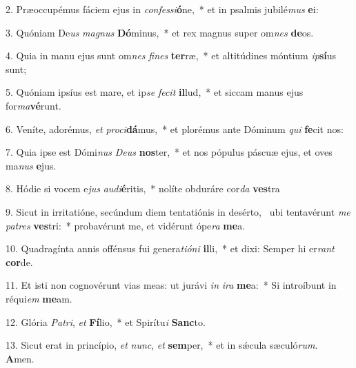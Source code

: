 2. Præoccupémus fáciem ejus in \textit{con}\textit{fes}\textit{si}\textbf{ó}ne,~*  et in psalmis jubilé\textit{mus} \textbf{e}i:\

3. Quóniam De\textit{us} \textit{ma}\textit{gnus} \textbf{Dó}minus,~*  et rex magnus super om\textit{nes} \textbf{de}os.\

4. Quia in manu ejus sunt om\textit{nes} \textit{fi}\textit{nes} \textbf{ter}ræ,~*  et altitúdines móntium \textit{ip}\textbf{sí}us sunt;\

5. Quóniam ipsíus est mare, et ip\textit{se} \textit{fe}\textit{cit} \textbf{il}lud,~*  et siccam manus ejus for\textit{ma}\textbf{vé}runt.\

6. Veníte, adorémus, \textit{et} \textit{pro}\textit{ci}\textbf{dá}mus,~*  et plorémus ante Dóminum \textit{qui} \textbf{fe}cit nos:\

7. Quia ipse est Dómi\textit{nus} \textit{De}\textit{us} \textbf{nos}ter,~*  et nos pópulus páscuæ ejus, et oves ma\textit{nus} \textbf{e}jus.\

8. Hódie si vocem e\textit{jus} \textit{au}\textit{di}\textbf{é}ritis,~*  nolíte obduráre cor\textit{da} \textbf{ves}tra\

9. Sicut in irritatióne, secúndum diem tentatiónis in desérto, \dag\  ubi tentavérunt \textit{me} \textit{pa}\textit{tres} \textbf{ves}tri:~*  probavérunt me, et vidérunt ópe\textit{ra} \textbf{me}a.\

10. Quadragínta annis offénsus fui genera\textit{ti}\textit{ó}\textit{ni} \textbf{il}li,~*  et dixi: Semper hi er\textit{rant} \textbf{cor}de.\

11. Et isti non cognovérunt vias meas: ut jurávi \textit{in} \textit{i}\textit{ra} \textbf{me}a:~*  Si introíbunt in réqui\textit{em} \textbf{me}am.\

12. Glória \textit{Pa}\textit{tri}, \textit{et} \textbf{Fí}lio,~*  et Spirítu\textit{i} \textbf{Sanc}to.\

13. Sicut erat in princípio, \textit{et} \textit{nunc}, \textit{et} \textbf{sem}per,~*  et in sǽcula sæculó\textit{rum}. \textbf{A}men.\

